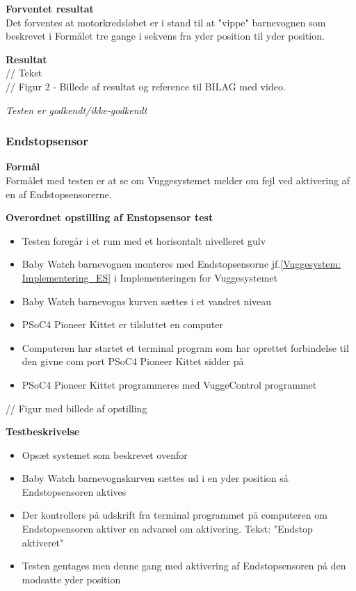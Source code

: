 \textbf{Forventet resultat} \\
Det forventes at motorkredsløbet er i stand til at "vippe" barnevognen som beskrevet i Formålet tre gange i sekvens fra yder position til yder position.

\textbf{Resultat} \\
// Tekst \\

// Figur 2 - Billede af resultat og reference til BILAG med video.

\textit{Testen er godkendt/ikke-godkendt}



\subsubsection{Endstopsensor}
\textbf{Formål} \\
Formålet med testen er at se om Vuggesystemet melder om fejl ved aktivering af en af Endstopsensorerne.

\textbf{Overordnet opstilling af Enstopsensor test}

\begin{itemize}
	\item Testen foregår i et rum med et horisontalt nivelleret gulv
	\item Baby Watch barnevognen monteres med Endstopsensorne jf.\ref{Vuggesystem: Implementering_ES} i Implementeringen for Vuggesystemet 
	\item Baby Watch barnevogns kurven sættes i et vandret niveau
	\item PSoC4 Pioneer Kittet er tilsluttet en computer
	\item Computeren har startet et terminal program som har oprettet forbindelse til den givne com port PSoC4 Pioneer Kittet sidder på
	\item PSoC4 Pioneer Kittet programmeres med VuggeControl programmet
\end{itemize}

// Figur med billede af opstilling

\textbf{Testbeskrivelse}
\begin{itemize}
	\item Opsæt systemet som beskrevet ovenfor
	\item Baby Watch barnevognskurven sættes ud i en yder position så Endstopsensoren aktives
	\item Der kontrollers på udskrift fra terminal programmet på computeren om Endstopsensoren aktiver en advarsel om aktivering. Tekst: "Endstop aktiveret"
	\item Testen gentages men denne gang med aktivering af Endstopsensoren på den modsatte yder position
\end{itemize}

